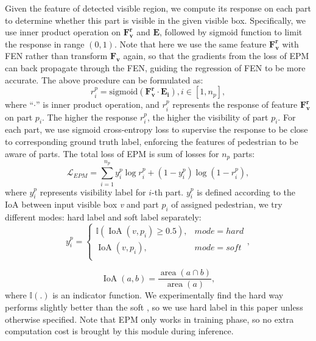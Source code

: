 \documentclass[10pt,twocolumn,letterpaper]{article}
\begin{document}
Given the feature of detected visible region, we compute its response on each part to determine whether this part is visible in the given visible box. Specifically, we use inner product operation on $\bm{F_v^r}$ and $\bm{E}$, followed by sigmoid function to limit the response in range $(0, 1)$. Note that here we use the same feature $\bm{F_v^r}$ with FEN rather than transform $\bm{F_v}$ again, so that the gradients from the loss of EPM can back propagate through the FEN, guiding the regression of FEN to be more accurate. The above procedure can be formulated as:
\begin{equation}
r_i^p=\mathrm{sigmoid}(\bm{F_v^r}\cdot \bm{E_i}), i\in{[1, n_p]},
\label{equ:part_resp}
\end{equation}
where ``$\cdot$'' is inner product operation, and $r_i^p$ represents the response of feature $\bm{F_v^r}$ on part $p_i$. The higher the response $r_i^p$, the higher the visibility of part $p_i$. For each part, we use sigmoid cross-entropy loss to supervise the response to be close to corresponding ground truth label, enforcing the features of pedestrian to be aware of parts. The total loss of EPM is sum of losses for $n_p$ parts:
\begin{equation}
\mathcal{L}_{EPM} = \sum_{i=1}^{n_p}y_i^p \operatorname{log} r_i^p + (1-y_i^p) \operatorname{log} (1-r_i^p),
\label{equ:part_loss}
\end{equation}
    where $y_i^p$ represents visibility label for $i$-th part. $y_i^p$ is defined according to the IoA between input visible box \textit{v} and part $p_i$ of assigned pedestrian, we try different modes: hard label and soft label separately:
\begin{equation}
y_i^p =\left\{
             \begin{array}{lr}
             \mathbb{I}{(\operatorname{IoA}(v, p_i) \ge 0.5)}, & mode=hard \\
             \operatorname{IoA}(v, p_i), & mode=soft\\
             \end{array},
\right.
\label{equ: part_gt}
\end{equation}

\begin{equation}
    \operatorname{IoA}(a, b) = \frac{\operatorname{area}(a \cap b)}{\operatorname{area}(a)},
\label{equ: ioa}
\end{equation}
where $\mathbb{I}{(.)}$ is an indicator function. We experimentally find the hard way performs slightly better than the soft , so we use hard label in this paper unless otherwise specified. Note that EPM only works in training phase, so no extra computation cost is brought by this module during inference.
\end{document}
